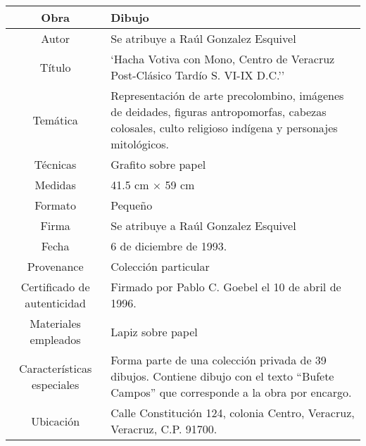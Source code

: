 \begin{table}[H]
\centering
\begin{tabular}{|c|m{}|}
\hline
Obra& Dibujo	\\
\hline
Autor & Se atribuye a Ra\'ul Gonzalez Esquivel\\
\hline
T\'itulo & `Hacha Votiva con Mono, Centro de Veracruz Post-Cl\'asico Tard\'io S. VI-IX D.C.''\\
\hline
Tem\'atica & Representaci\'on de arte precolombino, im\'agenes de deidades, figuras antropomorfas, cabezas colosales, culto religioso ind\'igena y personajes mitol\'ogicos.\\
\hline
T\'ecnicas &Grafito sobre papel \\
\hline
Medidas & 41.5 cm $\times$ 59 cm \\
\hline
 Formato & Peque\~no \\
 \hline
 Firma & Se atribuye a Ra\'ul Gonzalez Esquivel\\ 
 \hline
  Fecha & 6 de diciembre de 1993.\\
 \hline
 Provenance & Colecci\'on particular\\
 \hline
 Certificado de autenticidad& Firmado por Pablo C. Goebel el 10 de abril de 1996.  \\
 \hline 
  Materiales empleados & Lapiz sobre papel\\
 \hline
 Caracter\'isticas especiales & Forma parte de una colecci\'on privada de 39 dibujos. 
Contiene dibujo con el texto ``Bufete Campos'' que corresponde a la obra por encargo. \\
\hline 
Ubicaci\'on & Calle Constituci\'on 124, colonia Centro, Veracruz, Veracruz, C.P. 91700.\\
\hline

\end{tabular}
\end{table}

